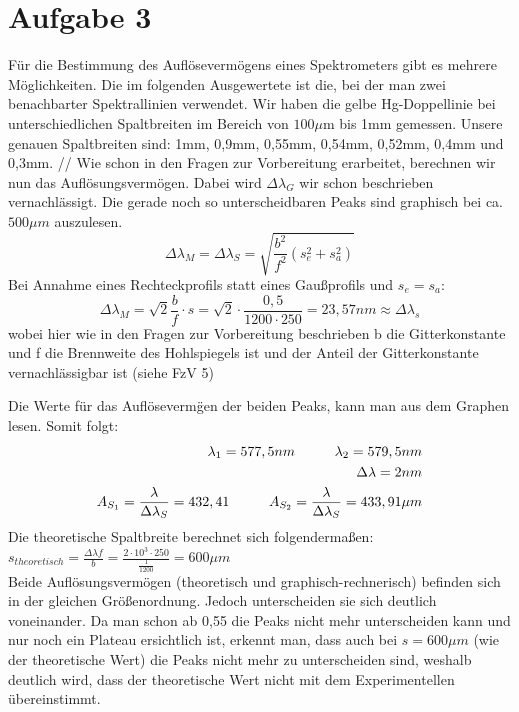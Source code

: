 \section{Aufgabe 3}
F\"ur die Bestimmung des Aufl\"oseverm\"ogens eines Spektrometers gibt es mehrere M\"oglichkeiten. Die im folgenden Ausgewertete ist die, bei der man zwei benachbarter 
Spektrallinien verwendet. Wir haben die gelbe Hg-Doppellinie bei unterschiedlichen Spaltbreiten im Bereich von $100\mu$m bis 1mm gemessen. 
Unsere genauen Spaltbreiten sind: 1mm, 0,9mm, 0,55mm, 0,54mm, 0,52mm, 0,4mm und 0,3mm. //
Wie schon in den Fragen zur Vorbereitung erarbeitet, berechnen wir nun das Aufl\"osungsverm\"ogen. Dabei wird $\Delta\lambda_G$ wir schon beschrieben vernachl\"assigt. 
Die gerade noch so unterscheidbaren Peaks sind graphisch bei ca. $500\mu m$ auszulesen.   \\
\begin{equation}
\Delta\lambda_M=\Delta\lambda_S=\sqrt{\frac{b^2}{f^2}(s_e^2+s_a^2)}
\end{equation}
Bei Annahme eines Rechteckprofils statt eines Gaußprofils und $s_e=s_a$:
\begin{equation}
\Delta\lambda_M=\sqrt{2}\frac{b}{f}\cdot s = \sqrt{2}\cdot \frac{0,5}{1200\cdot 250} =23,57nm \approx \Delta\lambda_s
\end{equation}
wobei hier wie in den Fragen zur Vorbereitung beschrieben b die Gitterkonstante und f die Brennweite des Hohlspiegels ist und der Anteil der Gitterkonstante 
vernachl\"assigbar ist (siehe FzV 5)

Die Werte f\"ur das Aufl\"oseverm\"gen der beiden Peaks, kann man aus dem Graphen lesen. Somit folgt:\\
\begin{align}
\lambda_1=577,5nm \hspace*{1cm} \lambda_2=579,5nm\\
\Delta\lambda=2nm\\
A_{S_1}=\frac{\lambda}{\Delta\lambda_S}=432,41 \hspace*{1cm} A_{S_2}=\frac{\lambda}{\Delta\lambda_S}=433,91\mu m
\end{align}
Die theoretische Spaltbreite berechnet sich folgenderma\ss{}en:\\
$s_{theoretisch} = \frac{\Delta\lambda f}{b}=\frac{2 \cdot 10^3 \cdot 250}{\frac{1}{1200}}= 600\mu m$\\
Beide Aufl\"osungsverm\"ogen (theoretisch und graphisch-rechnerisch) befinden sich in der gleichen Gr\"o\ss{}enordnung. Jedoch unterscheiden sie sich deutlich 
voneinander. Da man schon ab 0,55 die Peaks nicht mehr unterscheiden kann und nur noch ein Plateau ersichtlich ist, erkennt man, dass auch bei $s=600\mu m$ (wie der 
theoretische Wert) die Peaks nicht mehr zu unterscheiden sind, weshalb deutlich wird, dass der theoretische Wert nicht mit dem Experimentellen \"ubereinstimmt.
